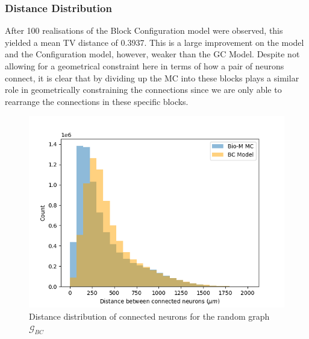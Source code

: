 \subsubsection{Distance Distribution}
After 100 realisations of the Block Configuration model were observed, this yielded a mean TV distance of 0.3937. This is a large improvement on the \ER model and the Configuration model, however, weaker than the GC Model. Despite not allowing for a geometrical constraint here in terms of how a pair of neurons connect, it is clear that by dividing up the MC into these blocks plays a similar role in geometrically constraining the connections since we are only able to rearrange the connections in these specific blocks.
\begin{figure}[H]
\begin{center}
\captionsetup{justification=centering}
\includegraphics[width=12cm]{BC/Block_dist_distr.png}
\caption{Distance distribution of connected neurons for the random graph $\mathcal{G}_{BC}$}
\end{center}
\end{figure}

